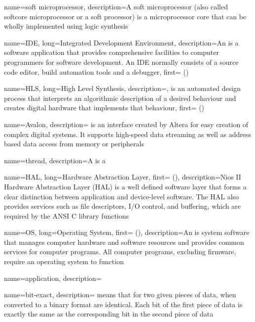 {
	name={soft microprocessor},
    description={A soft microprocessor (also called softcore microprocessor or a soft processor) is a microprocessor core that can be wholly implemented using logic synthesis}
}

{
	name={IDE},
    long={Integrated Development Environment},
    description={An  is a software application that provides comprehensive facilities to computer programmers for software development. An IDE normally consists of a source code editor, build automation tools and a debugger},
    first={} ()
}

{
	name={HLS},
    long={High Level Synthesis},
    description={, is an automated design process that interprets an algorithmic description of a desired behaviour and creates digital hardware that implements that behaviour},
    first={} ()
}

{
	name={Avalon},
    description={ is an interface created by Altera for easy creation of complex digital systems. It supports high-speed data streaming as well as address based data access from memory or peripherals}
}

{
	name={thread},
    description={A  is a }
}

{
	name={HAL},
    long={Hardware Abstraction Layer},
    first={} (),
    description={Nios II Hardware Abstraction Layer (HAL) is a well defined software layer that forms a clear distinction between application and device-level software. The HAL also provides services such as file descriptors, I/O control, and buffering, which are required by the ANSI C library functions\cite{wiki:hal}}
}

{
	name={OS},
    long={Operating System},
    first={} (),
    description={An  is system software that manages computer hardware and software resources and provides common services for computer programs. All computer programs, excluding firmware, require an operating system to function}
}

{
	name={application},
    description={}
}

{
	name={bit-exact},
    description={ means that for two given pieces of data, when converted to a binary format are identical. Each bit of the first piece of data is exactly the same as the corresponding bit in the second piece of data}
}

